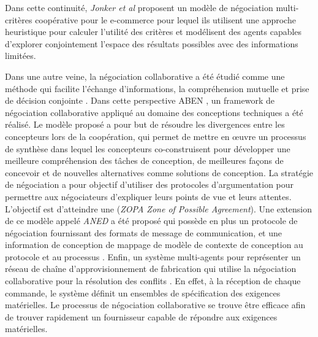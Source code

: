 		Dans cette continuité, \emph{Jonker et al} \cite{jonker2007agent} proposent un modèle de négociation multi-critères coopérative pour le e-commerce pour lequel ils utilisent une approche heuristique pour calculer l'utilité des critères et modélisent des agents capables d'explorer conjointement l'espace des résultats possibles avec des informations limitées. 
	
		Dans une autre veine, la négociation collaborative a été étudié comme une méthode qui facilite l'échange d'informations, la compréhension mutuelle et prise de décision conjointe \cite{jin2010study}. 
		Dans cette perspective ABEN \cite{jin2009argumentation}, un framework de négociation collaborative appliqué au domaine des conceptions techniques a été réalisé. Le modèle proposé a pour but de résoudre les divergences entre les concepteurs lors de la coopération, qui permet de mettre en œuvre un processus de synthèse dans lequel les concepteurs co-construisent pour développer une meilleure compréhension des tâches de conception, de meilleures façons de concevoir et de nouvelles alternatives comme solutions de conception. La stratégie de négociation a pour objectif d'utiliser des protocoles d'argumentation pour permettre aux négociateurs d'expliquer leurs points de vue et leurs attentes. L'objectif est d'atteindre une (\emph{ZOPA  Zone of Possible Agreement}). Une extension de ce modèle appelé \emph{ANED} a été proposé qui possède en plus un protocole de négociation fournissant des formats de message de communication, et une information de conception de mappage de modèle de contexte de conception au protocole et au processus \cite{jin2010study}. 	
		Enfin, un système multi-agents pour représenter un réseau de chaîne d'approvisionnement de fabrication qui utilise la négociation collaborative pour la résolution des conflits \cite{jiao2006agent}. En effet, à la réception de chaque commande, le système définit un ensembles de spécification des exigences matérielles. Le processus de négociation collaborative se trouve être efficace afin de trouver rapidement un fournisseur capable de répondre aux exigences matérielles.
		
